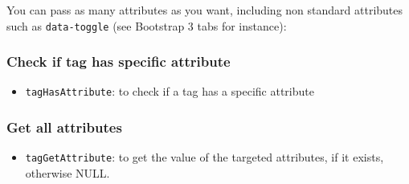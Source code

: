 \documentclass[
]{book}
\newenvironment{Shaded}{\begin{snugshade}}{\end{snugshade}}
\newcommand{\CommentTok}[1]{\textcolor[rgb]{0.56,0.35,0.01}{\textit{#1}}}
\newcommand{\DataTypeTok}[1]{\textcolor[rgb]{0.13,0.29,0.53}{#1}}
\newcommand{\KeywordTok}[1]{\textcolor[rgb]{0.13,0.29,0.53}{\textbf{#1}}}
\newcommand{\NormalTok}[1]{#1}
\newcommand{\OperatorTok}[1]{\textcolor[rgb]{0.81,0.36,0.00}{\textbf{#1}}}
\newcommand{\StringTok}[1]{\textcolor[rgb]{0.31,0.60,0.02}{#1}}
\providecommand{\tightlist}{%
  \setlength{\itemsep}{0pt}\setlength{\parskip}{0pt}}
\begin{document}
You can pass as many attributes as you want, including non standard attributes such as \texttt{data-toggle} (see Bootstrap 3 tabs for instance):

\begin{Shaded}
\end{Shaded}

\hypertarget{check-if-tag-has-specific-attribute}{%
\subsubsection{Check if tag has specific attribute}\label{check-if-tag-has-specific-attribute}}

\begin{itemize}
\tightlist
\item
  \texttt{tagHasAttribute}: to check if a tag has a specific attribute
\end{itemize}

\begin{Shaded}
\end{Shaded}

\hypertarget{get-all-attributes}{%
\subsubsection{Get all attributes}\label{get-all-attributes}}

\begin{itemize}
\tightlist
\item
  \texttt{tagGetAttribute}: to get the value of the targeted attributes, if it exists, otherwise NULL.
\end{itemize}
\end{document}
